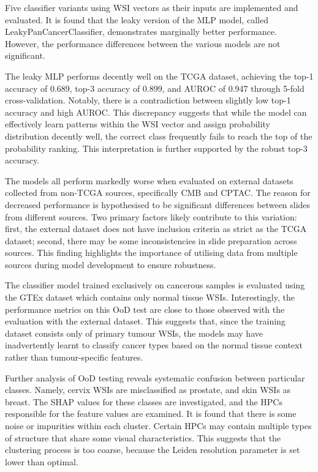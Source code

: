 \documentclass{l4proj}
\begin{document}
Five classifier variants using WSI vectors as their inputs are implemented and evaluated. It is found that the leaky version of the MLP model, called LeakyPanCancerClassifier, demonstrates marginally better performance. However, the performance differences between the various models are not significant.

The leaky MLP performs decently well on the TCGA dataset, achieving the top-1 accuracy of 0.689, top-3 accuracy of 0.899, and AUROC of 0.947 through 5-fold cross-validation. Notably, there is a contradiction between slightly low top-1 accuracy and high AUROC. This discrepancy suggests that while the model can effectively learn patterns within the WSI vector and assign probability distribution decently well, the correct class frequently fails to reach the top of the probability ranking. This interpretation is further supported by the robust top-3 accuracy.

The models all perform markedly worse when evaluated on external datasets collected from non-TCGA sources, specifically CMB and CPTAC. The reason for decreased performance is hypothesised to be significant differences between slides from different sources. Two primary factors likely contribute to this variation: first, the external dataset does not have inclusion criteria as strict as the TCGA dataset; second, there may be some inconsistencies in slide preparation across sources. This finding highlights the importance of utilising data from multiple sources during model development to ensure robustness.

The classifier model trained exclusively on cancerous samples is evaluated using the GTEx dataset which contains only normal tissue WSIs. Interestingly, the performance metrics on this OoD test are close to those observed with the evaluation with the external dataset. This suggests that, since the training dataset consists only of primary tumour WSIs, the models may have inadvertently learnt to classify cancer types based on the normal tissue context rather than tumour-specific features.

Further analysis of OoD testing reveals systematic confusion between particular classes. Namely, cervix WSIs are misclassified as prostate, and skin WSIs as breast. The SHAP values for these classes are investigated, and the HPCs responsible for the feature values are examined. It is found that there is some noise or impurities within each cluster. Certain HPCs may contain multiple types of structure that share some visual characteristics. This suggests that the clustering process is too coarse, because the Leiden resolution parameter is set lower than optimal.
\end{document}
